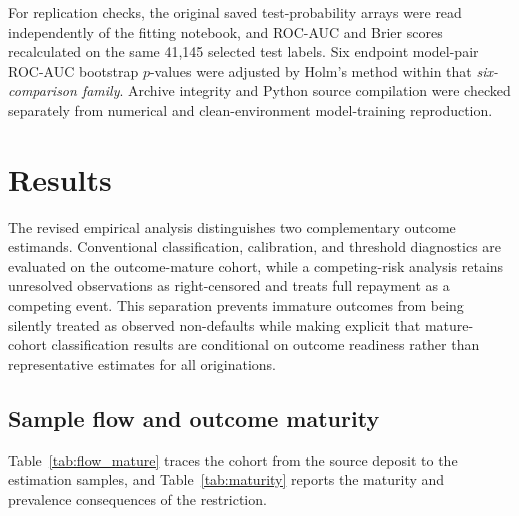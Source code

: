 \documentclass[10pt]{article}
\begin{document}
For replication checks, the original saved test-probability arrays were read independently of the fitting notebook, and ROC-AUC and Brier scores recalculated on the same 41,145 selected test labels. Six endpoint model-pair ROC-AUC bootstrap $p$-values were adjusted by Holm's method within that \emph{six-comparison family}. Archive integrity and Python source compilation were checked separately from numerical and clean-environment model-training reproduction.

\section{Results}
\label{sec:reanalysis}

The revised empirical analysis distinguishes two complementary outcome estimands. Conventional classification, calibration, and threshold diagnostics are evaluated on the outcome-mature cohort, while a competing-risk analysis retains unresolved observations as right-censored and treats full repayment as a competing event. This separation prevents immature outcomes from being silently treated as observed non-defaults while making explicit that mature-cohort classification results are conditional on outcome readiness rather than representative estimates for all originations.

\subsection{Sample flow and outcome maturity}

Table~\ref{tab:flow_mature} traces the cohort from the source deposit to the estimation samples, and Table~\ref{tab:maturity} reports the maturity and prevalence consequences of the restriction.
\end{document}
